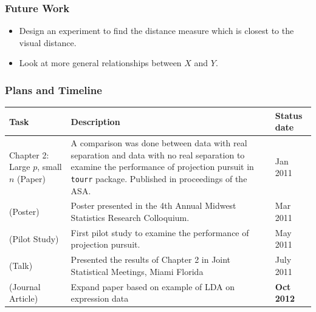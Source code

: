 \documentclass{beamer}
\begin{document}
\begin{frame}
\frametitle{Future Work}
\begin{itemize}
\item Design an experiment to find the distance measure which is closest to the visual distance.
\item Look at more general relationships between $X$ and $Y$. 
\end{itemize}
\end{frame}


\begin{frame}
\frametitle{Plans and Timeline}
\begin{table}[hbtp]
\small
\centering 
\begin{tabular}{|p{3cm}|p{6cm}|l|} 
\hline
Task &  Description & Status date\\ %
\hline
Chapter 2: Large $p$, small $n$ (Paper)  & A comparison was done between data with real separation and data with no real separation to examine the performance of projection pursuit in \texttt{tourr} package. Published in proceedings of the ASA. & Jan 2011 \\
(Poster) & Poster presented in the 4th Annual Midwest Statistics Research Colloquium. & Mar 2011 \\
(Pilot Study) & First pilot study to examine the performance of projection pursuit.   & May 2011\\ 
(Talk) & Presented the results of Chapter 2 in Joint Statistical Meetings, Miami Florida  & July 2011 \\
(Journal Article) & Expand paper based on example of LDA on expression data  & {\bf Oct 2012} \\\hline
\end{tabular}
\label{tbl:tjob}
\end{table}	
\end{frame}
\end{document}
